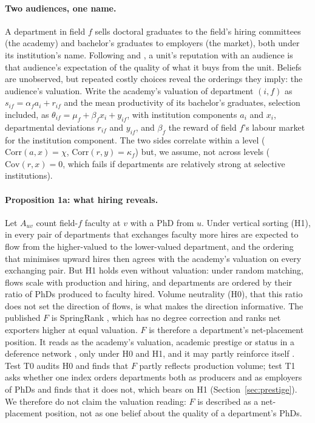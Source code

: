 \documentclass[11pt]{article}
\begin{document}
\paragraph{Two audiences, one name.} A department in field $f$ sells doctoral graduates to the field's hiring committees (the academy) and bachelor's
graduates to employers (the market), both under its institution's name. Following \citet{macleod2015reputation} and \citet{tadelis1999name}, a unit's
reputation with an audience is that audience's expectation of the quality of what it buys from the unit. Beliefs are unobserved, but repeated costly choices reveal the orderings they imply: the audience's valuation. Write the academy's valuation of department $(i,f)$ as $s_{if}=\alpha_fa_i+r_{if}$ and the mean
productivity of its bachelor's graduates, selection included, as $\theta_{if}=\mu_f+\beta_fx_i+y_{if}$, with
institution components $a_i$ and $x_i$, departmental deviations $r_{if}$ and $y_{if}$, and $\beta_f$ the reward of
field $f$'s labour market for the institution component. The two sides correlate within a level ($\mathrm{Corr}(a,x)=\chi$, $\mathrm{Corr}(r,y)=\kappa_f$) but, we
assume, not across levels ($\mathrm{Cov}(r,x)=0$, which fails if departments are relatively strong at selective
institutions).

\paragraph{Proposition 1a: what hiring reveals.} Let $A_{uv}$ count field-$f$ faculty at $v$ with a PhD from $u$.
Under vertical sorting (H1), in every pair of departments that exchanges faculty more hires are expected to flow
from the higher-valued to the lower-valued department, and the ordering that minimises upward hires then agrees
with the academy's valuation on every exchanging pair. But H1 holds even without valuation: under random matching,
flows scale with production and hiring, and departments are ordered by their ratio of PhDs produced to faculty
hired. Volume neutrality (H0), that this ratio does not set the direction of flows, is what makes the direction
informative. The published $F$ is SpringRank \citep{debacco2018physical}, which has no degree correction and ranks
net exporters higher at equal valuation. $F$ is therefore a department's net-placement position. It reads as the
academy's valuation, academic prestige or status in a deference network
\citep{burris2004academic,podolny1993status}, only under H0 and H1, and it may partly reinforce itself
\citep{long1979entrance}. Test T0 audits H0 and finds that $F$ partly reflects production volume; test T1 asks
whether one index orders departments both as producers and as employers of PhDs and finds that it does not, which
bears on H1 (Section~\ref{sec:prestige}). We therefore do not claim the valuation reading: $F$ is described as a
net-placement position, not as one belief about the quality of a department's PhDs.
\end{document}
